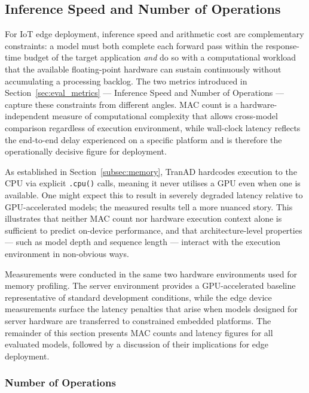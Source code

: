 \documentclass[twoside,11pt,openright]{report}
\begin{document}
\subsection{Inference Speed and Number of Operations}

For IoT edge deployment, inference speed and arithmetic cost are complementary
constraints: a model must both complete each forward pass within the response-time
budget of the target application \emph{and} do so with a computational workload
that the available floating-point hardware can sustain continuously without
accumulating a processing backlog. The two metrics introduced
in Section~\ref{sec:eval_metrics} --- Inference Speed and Number of Operations --- 
capture these
constraints from different angles. MAC count is a hardware-independent measure of
computational complexity that allows cross-model comparison regardless of execution
environment, while wall-clock latency reflects the end-to-end delay experienced on
a specific platform and is therefore the operationally decisive figure for deployment.

As established in Section~\ref{subsec:memory},
TranAD \citep{tranad2022} hardcodes execution to the CPU via explicit
\texttt{.cpu()} calls, meaning it never utilises a GPU even when one is available.
One might expect this to result in severely degraded latency relative to
GPU-accelerated models; the measured results tell a more nuanced story.
This illustrates that neither MAC count nor hardware execution context alone is
sufficient to predict on-device performance, and that architecture-level
properties --- such as model depth and sequence length --- interact with the
execution environment in non-obvious ways.

Measurements were conducted in the same two hardware environments used for memory
profiling. The server environment provides a GPU-accelerated baseline representative
of standard development conditions, while the edge device measurements surface the
latency penalties that arise when models designed for server hardware are transferred
to constrained embedded platforms. The remainder of this section presents MAC counts
and latency figures for all evaluated models, followed by a discussion of their
implications for edge deployment.

\subsubsection{Number of Operations}
\label{subsubsec:mac_results}
\end{document}
